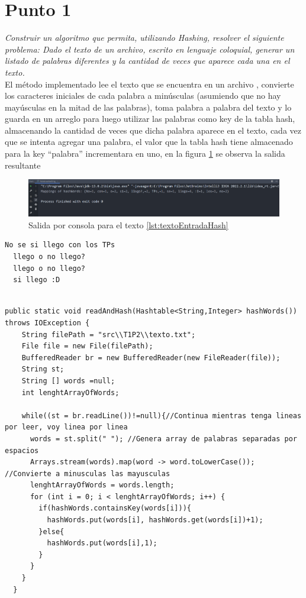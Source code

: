 \newpage
\section{Punto 1}
\textit{Construir un algoritmo que permita, utilizando Hashing, resolver el siguiente problema: Dado el texto de un archivo, escrito en lenguaje coloquial, generar un listado de palabras diferentes y la cantidad de veces que aparece cada una en el texto.
}\\


El método implementado lee el texto que se encuentra en un archivo , convierte los caracteres iniciales de cada palabra a minúsculas (asumiendo que no hay mayúsculas en la mitad de las palabras), toma palabra a palabra del texto y lo guarda en un arreglo para luego utilizar las palabras como key de la tabla hash, almacenando la cantidad de veces que dicha palabra aparece en el texto, cada vez que se intenta agregar una palabra, el valor que la tabla hash tiene almacenado para la key ``palabra'' incrementara en uno, en la figura \ref{fig:Consola hash palabra} se observa la salida resultante

\begin{figure}
  \centering
  \includegraphics[width=\textwidth, scale=1]{Images/Punto3/ConsolaHashPalabra.png}
  \caption{Salida por consola para el texto \ref{lst:textoEntradaHash} }
  \label{fig:Consola hash palabra}
\end{figure}

\begin{lstlisting}[style=java, caption= Texto de entrada, label={lst:textoEntradaHash}]
  No se si llego con los TPs
  llego o no llego?
  llego o no llego?
  si llego :D
  
 \end{lstlisting}
 \label{fig:Traza ordenamiento por conteo}

 \begin{lstlisting}[style=java, caption= Metodo readAndHash]
  public static void readAndHash(Hashtable<String,Integer> hashWords()) throws IOException {
    String filePath = "src\\T1P2\\texto.txt";
    File file = new File(filePath);
    BufferedReader br = new BufferedReader(new FileReader(file));
    String st;
    String [] words =null;
    int lenghtArrayOfWords;

    while((st = br.readLine())!=null){//Continua mientras tenga lineas por leer, voy linea por linea
      words = st.split(" "); //Genera array de palabras separadas por espacios
      Arrays.stream(words).map(word -> word.toLowerCase()); //Convierte a minusculas las mayusculas
      lenghtArrayOfWords = words.length;
      for (int i = 0; i < lenghtArrayOfWords; i++) {
        if(hashWords.containsKey(words[i])){
          hashWords.put(words[i], hashWords.get(words[i])+1);
        }else{
          hashWords.put(words[i],1);
        }
      }
    }
  }
 \end{lstlisting}